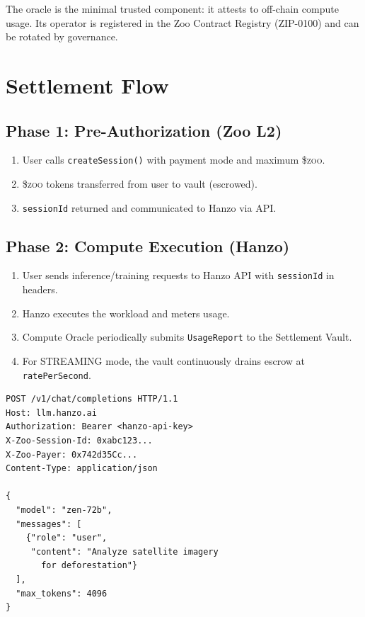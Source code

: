 \documentclass[11pt,letterpaper]{article}
\newcommand{\ZOO}{\$\textsc{zoo}}
\begin{document}
The oracle is the minimal trusted component: it attests to off-chain compute usage. Its operator is registered in the Zoo Contract Registry (ZIP-0100) and can be rotated by governance.

\section{Settlement Flow}
\label{sec:flow}

\subsection{Phase 1: Pre-Authorization (Zoo L2)}

\begin{enumerate}
    \item User calls \texttt{createSession()} with payment mode and maximum \ZOO{}.
    \item \ZOO{} tokens transferred from user to vault (escrowed).
    \item \texttt{sessionId} returned and communicated to Hanzo via API.
\end{enumerate}

\subsection{Phase 2: Compute Execution (Hanzo)}

\begin{enumerate}
    \item User sends inference/training requests to Hanzo API with \texttt{sessionId} in headers.
    \item Hanzo executes the workload and meters usage.
    \item Compute Oracle periodically submits \texttt{UsageReport} to the Settlement Vault.
    \item For STREAMING mode, the vault continuously drains escrow at \texttt{ratePerSecond}.
\end{enumerate}

\begin{lstlisting}[caption=Hanzo API integration via HTTP headers]
POST /v1/chat/completions HTTP/1.1
Host: llm.hanzo.ai
Authorization: Bearer <hanzo-api-key>
X-Zoo-Session-Id: 0xabc123...
X-Zoo-Payer: 0x742d35Cc...
Content-Type: application/json

{
  "model": "zen-72b",
  "messages": [
    {"role": "user",
     "content": "Analyze satellite imagery
       for deforestation"}
  ],
  "max_tokens": 4096
}
\end{lstlisting}
\end{document}
